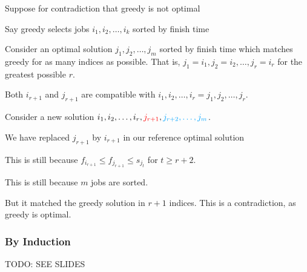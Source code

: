 \begin{listu}
    \item Suppose for contradiction that greedy is not optimal

    \item Say greedy selects jobs $i_1, i_2, \dots, i_k$ sorted by finish time

    \item Consider an optimal solution $j_1, j_2, \dots, j_m$ sorted by finish time which matches greedy for as many indices as possible. That is, $j_1 = i_1, j_2 = i_2, \dots, j_r = i_r$ for the greatest possible $r$.
    
    \item Both $i_{r+1}$ and $j_{r+1}$ are compatible with $i_1, i_2, \dots, i_r = j_1, j_2, \dots, j_r$.

    \item Consider a new solution $i_1, i_2, \dots, i_r, {\color{red}j_{r+1}}, {\color{lightBlue}j_{r+2}, \dots, j_m}$.
    
    \begin{listu}
        \item We have replaced $j_{r+1}$ by $i_{r+1}$ in our reference optimal solution
        \item This is still  because $f_{i_{r+1}} \le f_{j_{r+1}} \le s_{j_{t}}$ for $t \ge r+2$.
        \item This is still  because $m$ jobs are sorted. 
        \item But it matched the greedy solution in $r + 1$ indices. This is a contradiction, as greedy is optimal.
    \end{listu}
\end{listu}

\subsubsection{By Induction}

TODO: SEE SLIDES